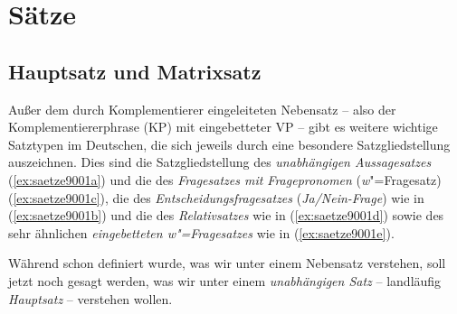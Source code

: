 \chapter{Sätze}

\label{sec:saetze}

\section{Hauptsatz und Matrixsatz}

\label{sec:hauptsatzmatrixsatz}

Außer dem durch Komplementierer eingeleiteten Nebensatz -- also der Komplementiererphrase (KP) mit eingebetteter VP -- gibt es weitere wichtige Satztypen im Deutschen, die sich jeweils durch eine besondere Satzgliedstellung auszeichnen.
Dies sind die Satzgliedstellung des \textit{unabhängigen Aussagesatzes} (\ref{ex:saetze9001a}) und die des \textit{Fragesatzes mit Fragepronomen} (\textit{w}"=Fragesatz) (\ref{ex:saetze9001c}), die des \textit{Entscheidungsfragesatzes} (\textit{Ja\slash Nein-Frage}) wie in (\ref{ex:saetze9001b}) und die des \textit{Relativsatzes} wie in (\ref{ex:saetze9001d}) sowie des sehr ähnlichen \textit{eingebetteten \textit{w}"=Fragesatzes} wie in (\ref{ex:saetze9001e}).

\begin{exe}
  \ex\label{ex:saetze9001}
  \begin{xlist}
  \end{xlist}
\end{exe}

Während schon definiert wurde, was wir unter einem Nebensatz verstehen, soll jetzt noch gesagt werden, was wir unter einem \textit{unabhängigen Satz} -- landläufig \textit{Hauptsatz} -- verstehen wollen.


